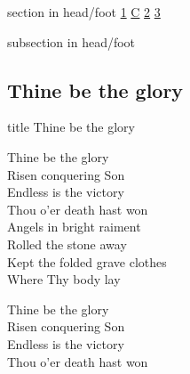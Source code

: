 \documentclass{beamer}
\begin{document}
{
{ 
 {
 \begin{beamercolorbox}[ht=4.5ex,dp=1.5ex,%
      leftskip=.3cm,rightskip=.3cm plus1fil]{section in head/foot}
 \fontsize{12}{25}\selectfont 
\hyperlink{Thine be the glory[]1}{1}
\hyperlink{Thine be the glory[]C}{C}
\hyperlink{Thine be the glory[]2}{2}
\hyperlink{Thine be the glory[]3}{3}
 
 \end{beamercolorbox}%
  \begin{beamercolorbox}[ht=2.5ex,dp=1.125ex,%
   leftskip=.3cm,rightskip=.3cm plus1fil]{subsection in head/foot}
   \insertauthor
 \end{beamercolorbox}%
 }
}
\subsection{ Thine be the glory }

\hypertarget{Thine be the glory[]}{}
\begin{frame}{}
 \vfill
  \centering
  \begin{beamercolorbox}[sep=8pt,center,shadow=true,rounded=true]{title}
    Thine be the glory     
  \end{beamercolorbox}
  \vfill
\end{frame}

\hypertarget{Thine be the glory[]1}{}
\begin{frame}{}
\fontsize{ 18 }{ 23 }\selectfont

Thine be the glory\\ 
Risen conquering Son\\ 
Endless is the victory\\ 
Thou o'er death hast won\\ 
Angels in bright raiment\\ 
Rolled the stone away\\ 
Kept the folded grave clothes\\ 
Where Thy body lay 

\end{frame}

\hypertarget{Thine be the glory[]C}{}
\begin{frame}{}
\fontsize{ 18 }{ 23 }\selectfont

Thine be the glory\\ 
Risen conquering Son\\ 
Endless is the victory\\ 
Thou o'er death hast won 


\end{frame}}
\end{document}

